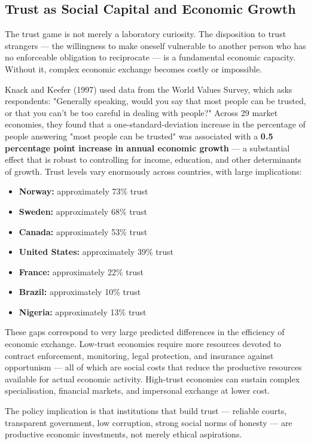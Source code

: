 \documentclass[12pt, letterpaper]{article}
\begin{document}
\subsection{Trust as Social Capital and Economic Growth}


The trust game is not merely a laboratory curiosity. The disposition to trust strangers --- the willingness to make oneself vulnerable to another person who has no enforceable obligation to reciprocate --- is a fundamental economic capacity. Without it, complex economic exchange becomes costly or impossible.

Knack and Keefer (1997) used data from the World Values Survey, which asks respondents: "Generally speaking, would you say that most people can be trusted, or that you can't be too careful in dealing with people?" Across 29 market economies, they found that a one-standard-deviation increase in the percentage of people answering "most people can be trusted" was associated with a \textbf{0.5 percentage point increase in annual economic growth} --- a substantial effect that is robust to controlling for income, education, and other determinants of growth.
\newpage
Trust levels vary enormously across countries, with large implications:
\begin{itemize}
\item \textbf{Norway:} approximately 73\% trust
\item \textbf{Sweden:} approximately 68\% trust
\item \textbf{Canada:} approximately 53\% trust
\item \textbf{United States:} approximately 39\% trust
\item \textbf{France:} approximately 22\% trust
\item \textbf{Brazil:} approximately 10\% trust
\item \textbf{Nigeria:} approximately 13\% trust
\end{itemize}

These gaps correspond to very large predicted differences in the efficiency of economic exchange. Low-trust economies require more resources devoted to contract enforcement, monitoring, legal protection, and insurance against opportunism --- all of which are social costs that reduce the productive resources available for actual economic activity. High-trust economies can sustain complex specialisation, financial markets, and impersonal exchange at lower cost.

The policy implication is that institutions that build trust --- reliable courts, transparent government, low corruption, strong social norms of honesty --- are productive economic investments, not merely ethical aspirations.
\end{document}
